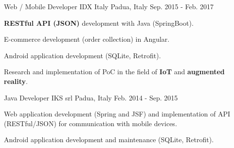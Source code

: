 \begin{cventries}
  \cventry
    {Web / Mobile Developer} %
    {IDX Italy} %
	{Padua, Italy} %
    {Sep. 2015 - Feb. 2017} %
    {
      \begin{cvitems} %
        \item {\textbf{RESTful API (JSON)} development with Java (SpringBoot)}.
        \item {E-commerce development (order collection) in Angular}.
        \item {Android application development (SQLite, Retrofit)}.
        \item {Research and implementation of PoC in the field of \textbf{IoT} and \textbf{augmented reality}}.
      \end{cvitems}
    }
\hfill \break
  \cventry
    {Java Developer} %
    {IKS srl} %
	{Padua, Italy} %
    {Feb. 2014 - Sep. 2015} %
    {
      \begin{cvitems} %
        \item {Web application development (Spring and JSF) and implementation of API (RESTful/JSON) for communication with mobile devices}.
        \item {Android application development and maintenance (SQLite, Retrofit)}.
      \end{cvitems}
    }

\end{cventries}
